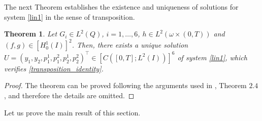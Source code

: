 \documentclass[11pt,a4paper]{amsart}
\numberwithin{equation}{section}
\newtheorem{theorem}{Theorem}[section]
\begin{document}
The next Theorem establishes the existence and uniqueness of solutions for system \eqref{lin1} in the sense of transposition.

\begin{theorem}\label{wellpo_trans_sis}
    Let $G_i \in L^2(Q)$, $i=1, \ldots, 6$, $h \in L^2(\omega\times (0,T))$ and $(f, g) \in  [H_0^1(I)]^2$. Then, there exists a unique solution  $U= \left (y_1,  y_2,  p_1^1,  p_1^2,  p_2^1, p_2^2\right)^{\top} \in \left[C\left([0, T]; L^2(I) \right)\right]^6$ of system \eqref{lin1}, which verifies \eqref{transposition_identity}. 
\end{theorem}
\begin{proof}
The theorem can be proved following the arguments used in \cite{BAPA}, Theorem $2.4$, and therefore the details are omitted.
\end{proof}
Let us prove the  main result of  this section. 
\end{document}
